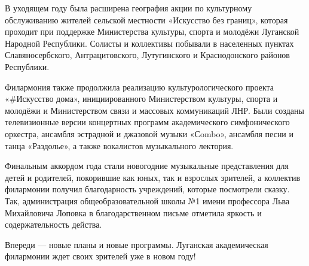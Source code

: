 В уходящем году была расширена география акции по культурному обслуживанию
жителей сельской местности «Искусство без границ», которая проходит при
поддержке Министерства культуры, спорта и молодёжи Луганской Народной
Республики. Солисты и коллективы побывали в населенных пунктах
Славяносербского, Антрацитовского, Лутугинского и Краснодонского районов
Республики.

Филармония также продолжила реализацию культурологического проекта «#Искусство
дома», инициированного Министерством культуры, спорта и молодёжи и
Министерством связи и массовых коммуникаций ЛНР. Были созданы телевизионные
версии концертных программ академического симфонического оркестра, ансамбля
эстрадной и джазовой музыки «Сombo», ансамбля песни и танца «Раздолье», а также
вокалистов музыкального лектория.

Финальным аккордом года стали новогодние музыкальные представления для детей и
родителей, покорившие как юных, так и взрослых зрителей, а коллектив филармонии
получил благодарность учреждений, которые посмотрели сказку. Так, администрация
общеобразовательной школы №1 имени профессора Льва Михайловича Лоповка в
благодарственном письме отметила яркость и содержательность действа.

Впереди — новые планы и новые программы. Луганская академическая филармонии
ждет своих зрителей уже в новом году!
